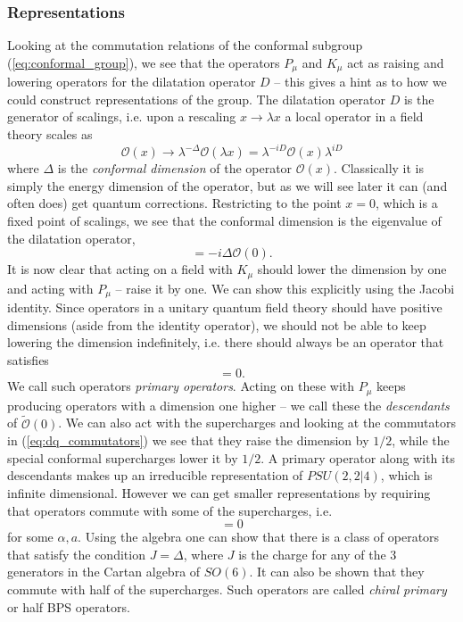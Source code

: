 \subsubsection{Representations}

Looking at the commutation relations of the conformal subgroup (\ref{eq:conformal_group}), we see that the operators $P_\mu$ and $K_\mu$ act as raising and lowering operators for the dilatation operator $D$ -- this gives a hint as to how we could construct representations of the group. The dilatation operator $D$ is the generator of scalings, i.e. upon a rescaling $x \rightarrow \lambda x$ a local operator in a field theory scales as 
\begin{equation}
	\mathcal{O}(x) \rightarrow \lambda^{-\Delta} \mathcal{O}(\lambda x) = \lambda^{-iD} \mathcal{O}(x) \lambda^{iD}
\end{equation}
where $\Delta$ is the \emph{conformal dimension} of the operator $\mathcal{O}(x)$. Classically it is simply the energy dimension of the operator, but as we will see later it can (and often does) get quantum corrections. Restricting to the point $x = 0$, which is a fixed point of scalings, we see that the conformal dimension is the eigenvalue of the dilatation operator,
\begin{equation}
	[D,\mathcal{O}(0)] = -i \Delta \mathcal{O}(0).
\end{equation}
It is now clear that acting on a field with $K_\mu$ should lower the dimension by one and acting with $P_\mu$ -- raise it by one. We can show this explicitly using the Jacobi identity. Since operators in a unitary quantum field theory should have positive dimensions (aside from the identity operator), we should not be able to keep lowering the dimension indefinitely, i.e. there should always be an operator that satisfies
\begin{equation}
	[K_\mu, \tilde{\mathcal{O}}(0)] = 0.
\end{equation} 
We call such operators \emph{primary operators}. Acting on these with $P_\mu$ keeps producing operators with a dimension one higher -- we call these the \emph{descendants} of $\tilde{\mathcal{O}}(0)$. We can also act with the supercharges and looking at the commutators in (\ref{eq:dq_commutators}) we see that they raise the dimension by $1/2$, while the special conformal supercharges lower it by $1/2$. A primary operator along with its descendants makes up an irreducible representation of $PSU(2,2|4)$, which is infinite dimensional. However we can get smaller representations by requiring that operators commute with some of the supercharges, i.e.
\begin{equation}
	[Q_{\alpha a}, \tilde{\mathcal{O}}(0)] = 0
\end{equation}
for some $\alpha, a$. Using the algebra one can show that there is a class of operators that satisfy the condition $J = \Delta$, where $J$ is the charge for any of the 3  generators in the Cartan algebra of $SO(6)$. It can also be shown that they commute with half of the supercharges. Such operators are called \emph{chiral primary} or half BPS operators.


